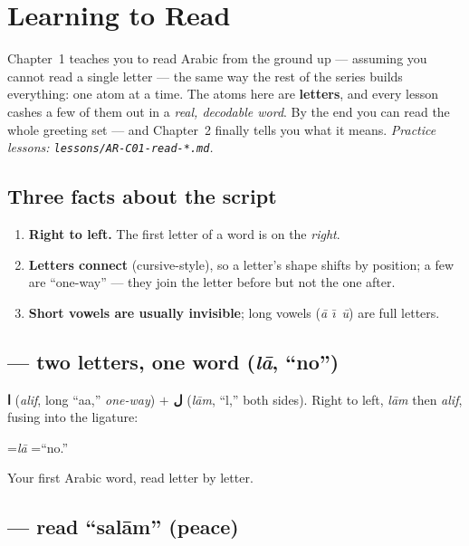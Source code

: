 \chapter{Learning to Read}
\label{ch:reading}

Chapter~1 teaches you to read Arabic from the ground up --- assuming you
cannot read a single letter --- the same way the rest of the series builds
everything: one atom at a time. The atoms here are \textbf{letters}, and every
lesson cashes a few of them out in a \emph{real, decodable word}. By the end you can read the whole greeting set --- and
Chapter~2 finally tells you what it means. \emph{Practice lessons:
\texttt{lessons/AR-C01-read-*.md}.}

\section*{Three facts about the script}

\begin{enumerate}
  \item \textbf{Right to left.} The first letter of a word is on the
    \emph{right}.
  \item \textbf{Letters connect} (cursive-style), so a letter's shape shifts
    by position; a few are ``one-way'' --- they join the letter before but not
    the one after.
  \item \textbf{Short vowels are usually invisible}; long vowels
    (\emph{\=a \=\i\ \=u}) are full letters.
\end{enumerate}

\section{ --- two letters, one word (\emph{l\=a}, ``no'')}
\label{lesson:read-la}

\textbf{ا} (\emph{alif}, long ``aa,'' \emph{one-way}) $+$ \textbf{ل}
(\emph{l\=am}, ``l,'' both sides). Right to left, \emph{l\=am} then
\emph{alif}, fusing into the ligature:
\begin{center} \quad=\quad \emph{l\=a} \quad=\quad ``no.''\end{center}
Your first Arabic word, read letter by letter.

\section{ --- read ``sal\=am'' (peace)}
\label{lesson:read-salam}


